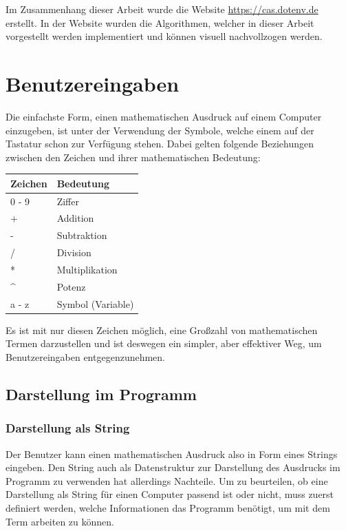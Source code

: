 \documentclass[11pt]{article}
\begin{document}
Im Zusammenhang dieser Arbeit wurde die Website \url{https://cas.dotenv.de} erstellt.
In der Website wurden die Algorithmen, welcher in dieser Arbeit vorgestellt werden implementiert
und können visuell nachvollzogen werden.

\section{Benutzereingaben}
Die einfachste Form, einen mathematischen Ausdruck auf einem Computer einzugeben, 
ist unter der Verwendung der Symbole, welche einem auf der Tastatur schon zur Verfügung stehen. 
Dabei gelten folgende Beziehungen zwischen den Zeichen und ihrer mathematischen Bedeutung:
\begin{table}[h]
\begin{tabular}{|l|l|}
\hline
  Zeichen               & Bedeutung         \\ \hline \hline
  0 - 9                 & Ziffer            \\ \hline
  +                     & Addition          \\ \hline
  -                     & Subtraktion        \\ \hline
  /                     & Division          \\ \hline
  *                     & Multiplikation    \\ \hline
  \textasciicircum      & Potenz            \\ \hline
  a - z                 & Symbol (Variable) \\ \hline
\end{tabular}
\end{table}

Es ist mit nur diesen Zeichen möglich, eine Großzahl von mathematischen Termen darzustellen 
und ist deswegen ein simpler, aber effektiver Weg, um Benutzereingaben entgegenzunehmen.

\subsection{Darstellung im Programm}
\subsubsection{Darstellung als String}

Der Benutzer kann einen mathematischen Ausdruck also in Form eines Strings eingeben. 
Den String auch als Datenstruktur zur Darstellung des Ausdrucks im Programm zu 
verwenden hat allerdings Nachteile. 
Um zu beurteilen, ob eine Darstellung als String für einen Computer passend ist oder nicht, 
muss zuerst definiert werden, welche Informationen das Programm benötigt,
um mit dem Term arbeiten zu können.
\end{document}
